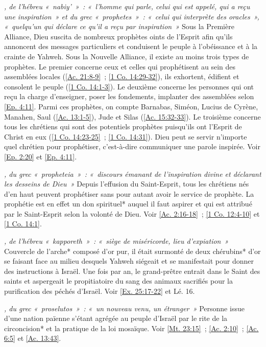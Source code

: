 \begin{multicols}{2}
\textit{, de l'hébreu «~nabiy'~»~: «~l'homme qui parle, celui qui est appelé, qui a reçu une inspiration~» et du grec «~prophetes~»~: «~celui qui interprète des oracles~», «~quelqu'un qui déclare ce qu'il a reçu par inspiration~»}\newline
Sous la Première Alliance, Dieu suscita de nombreux prophètes oints de l'Esprit afin qu'ils annoncent des messages particuliers et conduisent le peuple à l'obéissance et à la crainte de Yahweh. Sous la Nouvelle Alliance, il existe au moins trois types de prophètes. Le premier concerne ceux et celles qui prophétisent au sein des assemblées locales (\vref{Ac. 21:8-9}~; \vref{1 Co. 14:29-32}), ils exhortent, édifient et consolent le peuple (\vref{1 Co. 14:1-3}). Le deuxième concerne les personnes qui ont reçu la charge d'enseigner, poser les fondements, implanter des assemblées selon \vref{Ep. 4:11}. Parmi ces prophètes, on compte Barnabas, Siméon, Lucius de Cyrène, Manahen, Saul (\vref{Ac. 13:1-5}), Jude et Silas (\vref{Ac. 15:32-33}). Le troisième concerne tous les chrétiens qui sont des potentiels prophètes puisqu'ils ont l'Esprit de Christ en eux (\vref{1 Co. 14:23-25}~; \vref{1 Co. 14:31}). Dieu peut se servir n'importe quel chrétien pour prophétiser, c'est-à-dire communiquer une parole inspirée. Voir \vref{Ep. 2:20} et \vref{Ep. 4:11}.

\textit{, du grec «~propheteia~»~: «~discours émanant de l'inspiration divine et déclarant les desseins de Dieu~»}\newline
Depuis l'effusion du Saint-Esprit, tous les chrétiens nés d'en haut peuvent prophétiser sans pour autant avoir le service de prophète. La prophétie est en effet un don spirituel* auquel il faut aspirer et qui est attribué par le Saint-Esprit selon la volonté de Dieu. Voir \vref{Ac. 2:16-18}~; \vref{1 Co. 12:4-10} et \vref{1 Co. 14:1}.

\textit{, de l'hébreu «~kapporeth~»~: «~siège de miséricorde, lieu d'expiation~»}\newline
Couvercle de l'arche* composé d'or pur, il était surmonté de deux chérubins* d'or se faisant face au milieu desquels Yahweh siégeait et se manifestait pour donner des instructions à Israël. Une fois par an, le grand-prêtre entrait dans le Saint des saints et aspergeait le propitiatoire du sang des animaux sacrifiés pour la purification des péchés d'Israël. Voir \vref{Ex. 25:17-22} et Lé. 16.

\textit{, du grec «~proselutos~»~: «~un nouveau venu, un étranger~»}\newline
Personne issue d'une nation païenne s'étant agrégée au peuple d'Israël par le rite de la circoncision* et la pratique de la loi mosaïque. Voir \vref{Mt. 23:15}~; \vref{Ac. 2:10}~; \vref{Ac. 6:5} et \vref{Ac. 13:43}.


\end{multicols}
